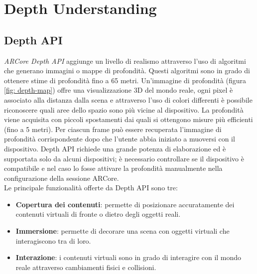\documentclass[crop=false, class=book]{standalone}
\begin{document}
		
	\chapter{Depth Understanding}
	
		\section{Depth API}
	
			\textit{ARCore Depth API} aggiunge un livello di realismo attraverso l'uso di algoritmi che generano immagini o mappe di profondità. Questi algoritmi sono in grado di ottenere stime di profondità fino a 65 metri. Un'immagine di profondità (figura \vref{fig: depth-map}) offre una visualizzazione 3D del mondo reale, ogni pixel è associato alla distanza dalla scena e attraverso l'uso di colori differenti è possibile riconoscere quali aree dello spazio sono più vicine al dispositivo. La profondità viene acquisita con piccoli spostamenti dai quali si ottengono misure più efficienti (fino a 5 metri). Per ciascun frame può essere recuperata l'immagine di profondità corrispondente dopo che l'utente abbia iniziato a muoversi con il dispositivo. Depth API richiede una grande potenza di elaborazione ed è supportata solo da alcuni dispositivi; è necessario controllare se il dispositivo è compatibile e nel caso lo fosse attivare la profondità manualmente nella configurazione della sessione ARCore.\\
		 	Le principale funzionalità offerte da Depth API sono tre:
		\begin{itemize}
			\item \textbf{Copertura dei contenuti}: permette di posizionare accuratamente dei contenuti virtuali di fronte o dietro degli oggetti reali.
			\item \textbf{Immersione}: permette di decorare una scena con oggetti virtuali che interagiscono tra di loro.
			\item \textbf{Interazione}: i contenuti virtuali sono in grado di interagire con il mondo reale attraverso cambiamenti fisici e collisioni.
		\end{itemize}
		
\end{document}
